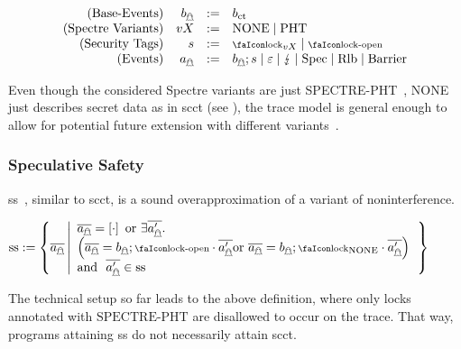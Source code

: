 \vspace{-1em}
{
\[
  \begin{array}{rrcl}
    (\text{Base-Events}) & \preevent[_{\mathghost}] &:=& \preevent[_{\ctsafe}] \\
    (\text{Spectre Variants}) & vX &:=& \operatorname{NONE} \mid \operatorname{PHT} \\
    (\text{Security Tags}) & \securitytag{} &:=& \lock_{vX} \mid \unlock\\ 
    (\text{Events}) & \event[_{\mathghost}] &:=& \preevent[_{\mathghost}];\securitytag{} \mid \emptyevent \mid \lightning \mid \ev{Spec} \mid \ev{Rlb} \mid \ev{Barrier}\\ 
  \end{array}
\]
}

Even though the considered Spectre variants are just SPECTRE-PHT~\cite{kocher2019spectre}, NONE just describes secret data as in \gls*{scct} (see ), the trace model is general enough to allow for potential future extension with different variants~\cite{kocher2019spectre,maisuradze2018ret2spec,horn2019zero}.

\subsubsection{Speculative Safety}

\gls*{ss}~\cite{patrignani2021exorcising}, similar to \gls*{scct}, is a sound overapproximation of a variant of noninterference.

\begin{definition}[\glsfirst*{ss}]\label{def:trace:ss}
  \noindent

  \begin{nscenter}
  $
    \sssafe:=\left\{\trace[_{\mathghost}] \left|\begin{array}{l}
      \trace[_{\mathghost}]=\hole{\cdot} \text{ or } \exists\trace[_{\mathghost}'].\\
      \left(\trace[_{\mathghost}]=\preevent[_{\mathghost}];\unlock\cdot\trace[_{\mathghost}'] \text{or }\trace[_{\mathghost}]=\preevent[_{\mathghost}];\lock_{\text{NONE}}\cdot\trace[_{\mathghost}']\right)\\
      \text{and }\ \trace[_{\mathghost}']\in\sssafe
                                 \end{array}\right.\right\}
  $ 
  \end{nscenter}
\end{definition}
The technical setup so far leads to the above definition, where only locks annotated with $\text{SPECTRE-PHT}$ are disallowed to occur on the trace.
That way, programs attaining \gls*{ss} do not necessarily attain \gls*{scct}.

